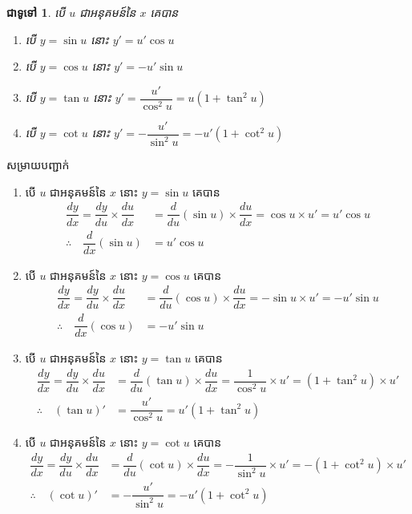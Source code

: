 \documentclass[12pt,fleqn]{book} %
\newtheorem{general}{\kml ជាទូទៅ}
\newcommand{\solution}{{\begin{center}\kml \color{blue} សម្រាយបញ្ជាក់\end{center} }}
\begin{document}
\begin{general}
បើ $u$ ជាអនុគមន៍នៃ $x$ គេបាន 
\begin{enumerate}
\item បើ $y=\sin u$ នោះ $y'=u'\cos u$ 
\item បើ $y=\cos u$ នោះ $y'=-u'\sin u$  
\item បើ $y=\tan u$ នោះ $y'=\dfrac{u'}{\cos^2 u}=u(1+\tan^2 u)$
\item បើ $y=\cot u$ នោះ $y'=-\dfrac{u'}{\sin^2 u}=-u'(1+\cot^2 u)$
\end{enumerate}

\end{general}
\solution 
\begin{enumerate}

\item បើ $u$ ជាអនុគមន៍នៃ $x$ នោះ $y=\sin u$ គេបាន 
\begin{align*}
\dfrac{dy}{dx}=\dfrac{dy}{du}\times \dfrac{du}{dx}&=\dfrac{d}{du}(\sin u)\times \dfrac{du}{dx}=\cos u \times u'=u'\cos u\\
\therefore \quad \dfrac{d}{dx}(\sin u)&=u'\cos u
\end{align*}
\item បើ $u$ ជាអនុគមន៍នៃ $x$ នោះ $y=\cos u$ គេបាន 
\begin{align*}
\dfrac{dy}{dx}=\dfrac{dy}{du}\times \dfrac{du}{dx}&=\dfrac{d}{du}(\cos u)\times \dfrac{du}{dx}=-\sin u \times u'=-u'\sin u\\
\therefore \quad \dfrac{d}{dx}(\cos u)&=-u'\sin u
\end{align*}
\item បើ $u$ ជាអនុគមន៍នៃ $x$ នោះ $y=\tan u$ គេបាន 
\begin{align*}
\dfrac{dy}{dx}=\dfrac{dy}{du}\times \dfrac{du}{dx}&=\dfrac{d}{du}(\tan u)\times \dfrac{du}{dx}=\dfrac{1}{\cos^2 u} \times u'=(1+\tan^2 u)\times u'\\
\therefore \quad (\tan u)'&=\dfrac{u'}{\cos^2 u}=u'(1+\tan^2 u)
\end{align*}
\item បើ $u$ ជាអនុគមន៍នៃ $x$ នោះ $y=\cot u$ គេបាន 
\begin{align*}
\dfrac{dy}{dx}=\dfrac{dy}{du}\times \dfrac{du}{dx}&=\dfrac{d}{du}(\cot u)\times \dfrac{du}{dx}=-\dfrac{1}{\sin^2 u} \times u'=-(1+\cot^2 u)\times u'\\
\therefore \quad (\cot u)'&=-\dfrac{u'}{\sin ^2 u}=-u'(1+\cot^2 u)
\end{align*}
\end{enumerate}
\end{document}
